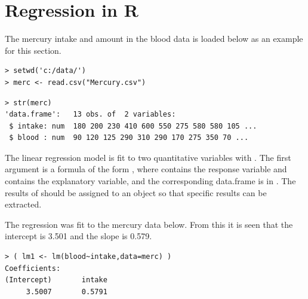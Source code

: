 \documentclass[10pt,openany]{book}\usepackage[]{graphicx}\usepackage[]{color}
\makeatletter
\newenvironment{kframe}{%
 \def\at@end@of@kframe{}%
 \ifinner\ifhmode%
  \def\at@end@of@kframe{\end{minipage}}%
  \begin{minipage}{\columnwidth}%
 \fi\fi%
 \def\FrameCommand##1{\hskip\@totalleftmargin \hskip-\fboxsep
 \colorbox{shadecolor}{##1}\hskip-\fboxsep
     \hskip-\linewidth \hskip-\@totalleftmargin \hskip\columnwidth}%
 \MakeFramed {\advance\hsize-\width
   \@totalleftmargin\z@ \linewidth\hsize
   \@setminipage}}%
 {\par\unskip\endMakeFramed%
 \at@end@of@kframe}
\newenvironment{knitrout}{}{} %
\makeatother
\begin{document}
\section{Regression in R}
\vspace{-12pt}
The mercury intake and amount in the blood data is loaded below as an example for this section.
\begin{knitrout}
\color{fgcolor}\begin{kframe}
\begin{verbatim}
> setwd('c:/data/')
> merc <- read.csv("Mercury.csv")
\end{verbatim}
\end{kframe}
\end{knitrout}
\vspace{-14pt}
\begin{knitrout}
\color{fgcolor}\begin{kframe}
\begin{verbatim}
> str(merc)
'data.frame':	13 obs. of  2 variables:
 $ intake: num  180 200 230 410 600 550 275 580 580 105 ...
 $ blood : num  90 120 125 290 310 290 170 275 350 70 ...
\end{verbatim}
\end{kframe}
\end{knitrout}

The linear regression model is fit to two quantitative variables with .  The first argument is a formula of the form , where  contains the response variable and  contains the explanatory variable, and the corresponding data.frame is in .  The results of  should be assigned to an object so that specific results can be extracted.




The regression was fit to the mercury data below. From this it is seen that the intercept is 3.501 and the slope is 0.579.
\begin{knitrout}
\color{fgcolor}\begin{kframe}
\begin{verbatim}
> ( lm1 <- lm(blood~intake,data=merc) )
Coefficients:
(Intercept)       intake  
     3.5007       0.5791  
\end{verbatim}
\end{kframe}
\end{knitrout}
\end{document}
